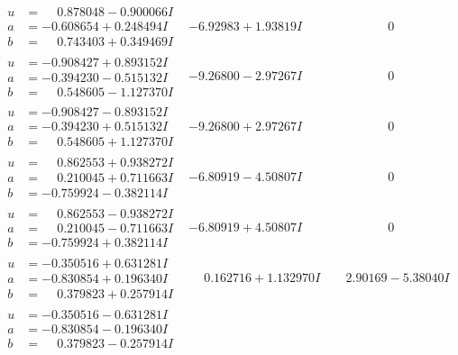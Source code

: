 \documentclass[1p]{elsarticle_modified}
\theoremstyle{definition}
\begin{document}
$$\begin{array}{c|c|c}
\begin{aligned}
u &= \phantom{-}0.878048 - 0.900066 I \\
a &= -0.608654 + 0.248494 I \\
b &= \phantom{-}0.743403 + 0.349469 I\end{aligned}
 & -6.92983 + 1.93819 I & \phantom{-0.000000 } 0 \\ \hline\begin{aligned}
u &= -0.908427 + 0.893152 I \\
a &= -0.394230 - 0.515132 I \\
b &= \phantom{-}0.548605 - 1.127370 I\end{aligned}
 & -9.26800 - 2.97267 I & \phantom{-0.000000 } 0 \\ \hline\begin{aligned}
u &= -0.908427 - 0.893152 I \\
a &= -0.394230 + 0.515132 I \\
b &= \phantom{-}0.548605 + 1.127370 I\end{aligned}
 & -9.26800 + 2.97267 I & \phantom{-0.000000 } 0 \\ \hline\begin{aligned}
u &= \phantom{-}0.862553 + 0.938272 I \\
a &= \phantom{-}0.210045 + 0.711663 I \\
b &= -0.759924 - 0.382114 I\end{aligned}
 & -6.80919 - 4.50807 I & \phantom{-0.000000 } 0 \\ \hline\begin{aligned}
u &= \phantom{-}0.862553 - 0.938272 I \\
a &= \phantom{-}0.210045 - 0.711663 I \\
b &= -0.759924 + 0.382114 I\end{aligned}
 & -6.80919 + 4.50807 I & \phantom{-0.000000 } 0 \\ \hline\begin{aligned}
u &= -0.350516 + 0.631281 I \\
a &= -0.830854 + 0.196340 I \\
b &= \phantom{-}0.379823 + 0.257914 I\end{aligned}
 & \phantom{-}0.162716 + 1.132970 I & \phantom{-}2.90169 - 5.38040 I \\ \hline\begin{aligned}
u &= -0.350516 - 0.631281 I \\
a &= -0.830854 - 0.196340 I \\
b &= \phantom{-}0.379823 - 0.257914 I\end{aligned}

\end{array}$$
\end{document}

